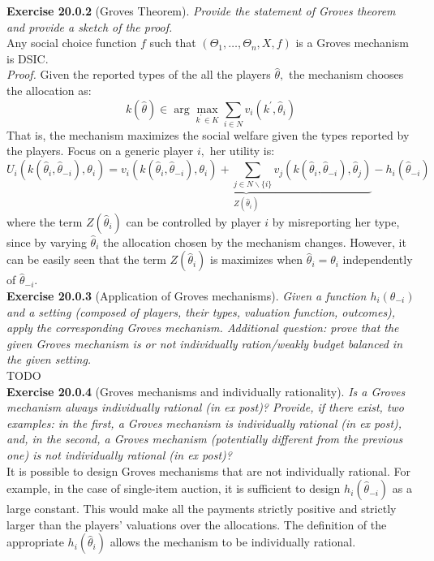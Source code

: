 \textbf{Exercise 20.0.2} (Groves Theorem). \textit{Provide the statement of Groves theorem and provide a sketch of the proof.}\\

Any social choice function $f$ such that $\left(\Theta_{1}, \ldots, \Theta_{n}, X, f\right)$ is a Groves mechanism is DSIC.\\
\textit{Proof.} Given the reported types of the all the players $\hat{\theta},$ the mechanism chooses the allocation as:
$$
k(\hat{\theta}) \in \arg \max _{k^{\prime} \in K} \sum_{i \in N} v_{i}\left(k^{\prime}, \hat{\theta}_{i}\right)
$$
That is, the mechanism maximizes the social welfare given the types reported by the players. Focus on a generic player $i,$ her utility is:
$$
U_{i}\left(k\left(\hat{\theta}_{i}, \hat{\theta}_{-i}\right), \theta_{i}\right)= \underbrace{v_{i}\left(k\left(\hat{\theta}_{i}, \hat{\theta}_{-i}\right), \theta_{i}\right)+\sum_{j \in N \backslash\{i\}} v_{j}\left(k\left(\hat{\theta}_{i}, \hat{\theta}_{-i}\right), \hat{\theta}_{j}\right)}_{Z(\hat{\theta}_{i})}-h_{i}\left(\hat{\theta}_{-i}\right)
$$
where the term $Z(\hat{\theta}_{i})$ can be controlled by player $i$ by misreporting her type, since by varying $\hat{\theta}_{i}$ the allocation chosen by the mechanism changes. However, it can be easily seen that the term $Z(\hat{\theta}_{i})$ is maximizes when $\hat{\theta}_{i}=\theta_{i}$ independently of $\hat{\theta}_{-i}$.\\

\textbf{Exercise 20.0.3} (Application of Groves mechanisms). \textit{Given a function $h_i (\theta_{-i})$ and a setting (composed of players, their types, valuation function, outcomes), apply the corresponding Groves mechanism. Additional question: prove that the given Groves mechanism is or not individually ration/weakly budget balanced in the given setting.}\\

TODO\\

\textbf{Exercise 20.0.4} (Groves mechanisms and individually rationality). \textit{Is a Groves mechanism always individually rational (in ex post)? Provide, if there exist, two examples: in the first, a Groves mechanism is individually rational (in ex post), and, in the second, a Groves mechanism (potentially different from the previous one) is not individually rational (in ex post)?}\\

It is possible to design Groves mechanisms that are not individually rational. For example, in the case of single-item auction, it is sufficient to design $h_i (\hat{\theta}_{-i})$ as a large constant. This would make all the payments strictly positive and strictly larger than the players' valuations over the allocations. The definition of the appropriate $h_i (\hat{\theta}_{i})$ allows the mechanism to be individually rational.\\


